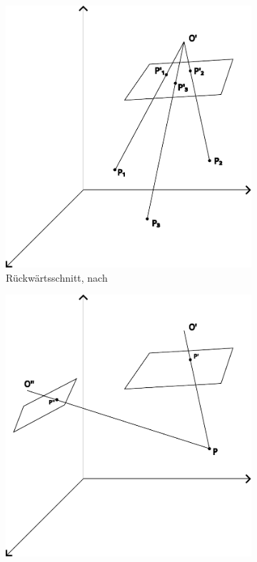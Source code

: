 \documentclass[./00PhotoBox.tex]{subfiles}
\begin{document}
\begin{figure}
    \centering
    \begin{subfigure}{0.45\textwidth}
        \includegraphics[width=0.9\linewidth]{img/2_grundlagen/rueckwaertsschnitt.pdf}
        \centering
        \caption{Rückwärtsschnitt, nach \citealt[S. 284]{luhmann}} %
        \label{img:rueckwaertsschnitt} %
    \end{subfigure}
    \begin{subfigure}{0.45\textwidth}
        \includegraphics[width=0.9\linewidth]{img/2_grundlagen/vorwaertsschnitt.pdf}

\end{subfigure}
\end{figure}
\end{document}
